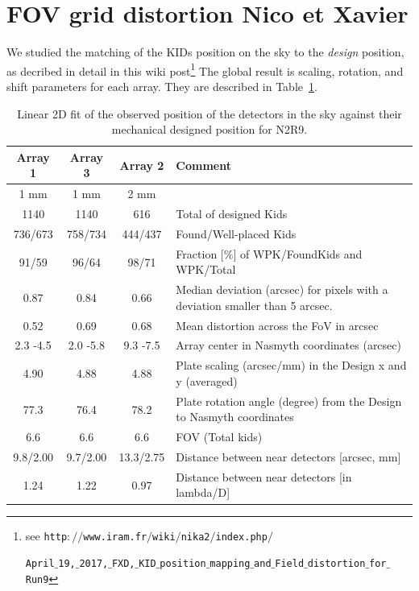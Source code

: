\section{FOV grid distortion {\color{blue} Nico et Xavier }  }
\label{se:grid_distortion}

We studied the matching of the KIDs position on the sky to the
\emph{design} position, as decribed in detail in this wiki post\footnote{see
  {\tt http$://$www.iram.fr$/$wiki$/$nika2$/$index.php$/$}
  
  {\tt April$\_$19,$\_$2017,$\_$FXD,$\_$KID$\_$position$\_$mapping$\_$and$\_$Field$\_$distortion$\_$for$\_$Run9}
}
The global result is scaling, rotation, and shift parameters for each
array. They are described in Table~\ref{ta:gridmatch}.

\begin{table}[ht]
\label{ta:gridmatch}
\begin{center}
\begin{tabular}{|c|c|c|l|}
\hline
Array 1  &	Array 3   &	Array 2   &	Comment \\
\hline
1 mm      &       1 mm     &        2 mm  & \\
1140 	 &      1140 	   &        616  &	Total of designed Kids \\
736/673  &	758/734  &	444/437  &	Found/Well-placed Kids \\
91/59 	 &    96/64 	 &      98/71 	 & Fraction [\%] of WPK/FoundKids and WPK/Total \\
0.87 	 &     0.84 	  & 0.66     &	Median deviation (arcsec) for pixels with a deviation smaller than 5 arcsec. \\
0.52 	 &     0.69 	 &        0.68 	 & Mean distortion across the FoV in arcsec \\
2.3 -4.5  &	2.0 -5.8  &	9.3 -7.5  &	Array center in Nasmyth coordinates (arcsec) \\
4.90  &	4.88  &	4.88  &	Plate scaling (arcsec/mm) in the Design x and y (averaged) \\
77.3  &	76.4  &	78.2  &	Plate rotation angle (degree) from the Design to Nasmyth coordinates \\
6.6  &	6.6  &	6.6  &	FOV (Total kids) \\
9.8/2.00  &	9.7/2.00  &	13.3/2.75  &	Distance between near detectors [arcsec, mm] \\
1.24  &	1.22  &	0.97  &	Distance between near detectors [in lambda/D] \\
\hline
\end{tabular}
\end{center}
\caption[Field-of-view deformations]{Linear 2D fit of the observed position of the detectors in the sky
  against their mechanical designed position for N2R9. }
\end{table}

